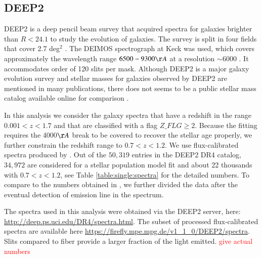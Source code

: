 \documentclass[onecolumn]{aa}
\begin{document}
\subsection{DEEP2}
DEEP2 is a deep pencil beam survey that acquired spectra for galaxies brighter than $R<24.1$ to study the evolution of galaxies. The survey is split in four fields that cover 2.7 deg$^2$  \citep{Newman_2013}. 
The DEIMOS spectrograph at Keck was used, which covers approximately the wavelength range $6500-9300\AA$ at a resolution $\sim$6000 \citep{Faber2003}. It accommodates order of 120 slits per mask. 
Although DEEP2 is a major galaxy evolution survey and stellar masses for galaxies observed by DEEP2 are mentioned in many publications, there does not seems to be a public stellar mass catalog available online for comparison \citep{kassin2007,covington2010,mostek2013,2017ApJ...838...87C}. 

In this analysis we consider the galaxy spectra that have a redshift in the range $0.001<z<1.7$ and that are classified with a flag $Z\_FLG\geq2$. 
Because the fitting requires the 4000$\AA$ break to be covered to recover the stellar age properly, we further constrain the redshift range to $0.7<z<1.2$. 
We use flux-calibrated spectra produced by \citet{Comparat2016LFs}. 
Out of the $50,319$ entries in the DEEP2 DR4 catalog, $34,972$ are considered for a stellar population model fit and about 22 thousands with $0.7<z<1.2$, see Table \ref{table:single:spectra} for the detailed numbers. 
To compare to the numbers obtained in \citet{Comparat2016LFs}, we further divided the data after the eventual detection of emission line in the spectrum. 


The spectra used in this analysis were obtained via the DEEP2 server, here: \url{http://deep.ps.uci.edu/DR4/spectra.html}. 
The subset of processed flux-calibrated spectra are available here \url{https://firefly.mpe.mpg.de/v1_1_0/DEEP2/spectra}. Slits compared to fiber provide a larger fraction of the light emitted. \textcolor{red}{give actual numbers}
\end{document}
